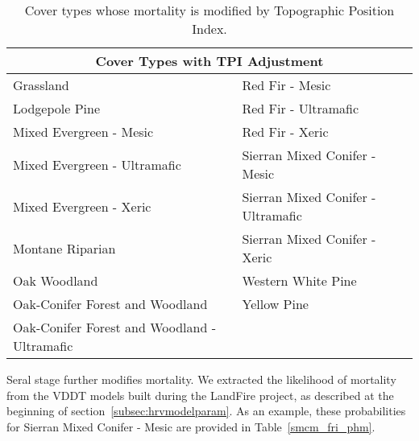 \begin{itemize}
\begin{table}[htbp]
\small
\centering
\caption{Cover types whose mortality is modified by Topographic Position Index.}
\label{covtpi_mort}
\begin{tabular}{ll}
\hline
\multicolumn{2}{c}{\textbf{Cover Types with TPI Adjustment}} \\
\hline
Grassland     									& Red Fir - Mesic   					\\
Lodgepole Pine    								& Red Fir - Ultramafic					\\
Mixed Evergreen - Mesic							& Red Fir - Xeric    					\\
Mixed Evergreen - Ultramafic     				& Sierran Mixed Conifer - Mesic    		\\
Mixed Evergreen - Xeric 						& Sierran Mixed Conifer - Ultramafic 	\\
Montane Riparian								& Sierran Mixed Conifer - Xeric 		\\
Oak Woodland 									& Western White Pine					\\
Oak-Conifer Forest and Woodland 				& Yellow Pine 							\\
Oak-Conifer Forest and Woodland - Ultramafic 	&										\\
\hline
\end{tabular}
\end{table}

Seral stage further modifies mortality. We extracted the likelihood of mortality from the VDDT models built during the LandFire project, as described at the beginning of section~\ref{subsec:hrvmodelparam}. As an example, these probabilities for Sierran Mixed Conifer - Mesic are provided in Table~\ref{smcm_fri_phm}.



\end{itemize}

